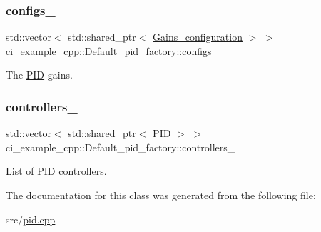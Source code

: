\subsubsection{\texorpdfstring{configs\+\_\+}{configs\_}}
{\footnotesize\ttfamily std\+::vector$<$ std\+::shared\+\_\+ptr$<$ \hyperlink{classci__example__cpp_1_1Gains__configuration}{Gains\+\_\+configuration} $>$ $>$ ci\+\_\+example\+\_\+cpp\+::\+Default\+\_\+pid\+\_\+factory\+::configs\+\_\+\hspace{0.3cm}{\ttfamily [static]}}



The \hyperlink{classci__example__cpp_1_1PID}{P\+ID} gains. 

\mbox{\label{classci__example__cpp_1_1Default__pid__factory_a39274f87a4700b707ba983d54db2df76}} 
\subsubsection{\texorpdfstring{controllers\+\_\+}{controllers\_}}
{\footnotesize\ttfamily std\+::vector$<$ std\+::shared\+\_\+ptr$<$ \hyperlink{classci__example__cpp_1_1PID}{P\+ID} $>$ $>$ ci\+\_\+example\+\_\+cpp\+::\+Default\+\_\+pid\+\_\+factory\+::controllers\+\_\+\hspace{0.3cm}{\ttfamily [static]}}



List of \hyperlink{classci__example__cpp_1_1PID}{P\+ID} controllers. 



The documentation for this class was generated from the following file\+:\begin{DoxyCompactItemize}
\item 
src/\hyperlink{pid_8cpp}{pid.\+cpp}\end{DoxyCompactItemize}
